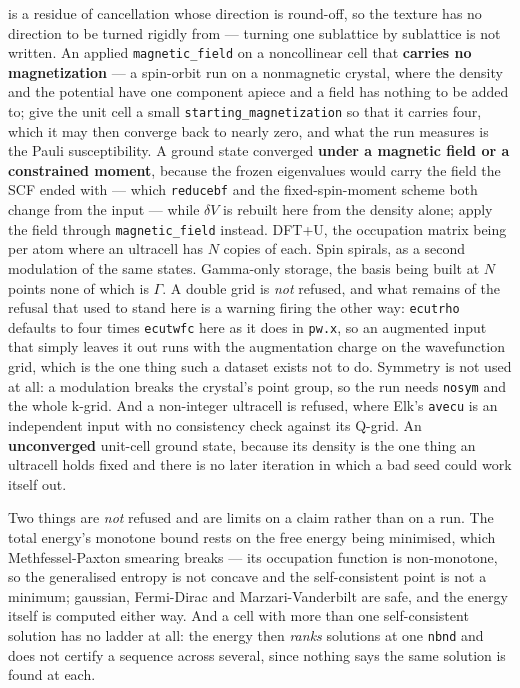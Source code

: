\documentclass[11pt,a4paper]{article}
\newcommand{\code}[1]{\texttt{\small #1}}
\begin{document}
\begin{refuses}
is a residue of cancellation whose direction is round-off, so the texture has no
direction to be turned rigidly from --- turning one sublattice by sublattice is
not written. An applied \code{magnetic\_field} on a noncollinear cell that
\textbf{carries no magnetization} --- a spin-orbit run on a nonmagnetic
crystal, where the density and the potential have one component apiece and a
field has nothing to be added to; give the unit cell a small
\code{starting\_magnetization} so that it carries four, which it may then
converge back to nearly zero, and what the run measures is the Pauli
susceptibility. A ground state converged \textbf{under
a magnetic field or a constrained moment}, because the frozen eigenvalues would
carry the field the SCF ended with --- which \code{reducebf} and the
fixed-spin-moment scheme both change from the input --- while $\delta V$ is
rebuilt here from the density alone; apply the field through
\code{magnetic\_field} instead. DFT+U, the occupation matrix being per atom
where an ultracell has $N$ copies of each. Spin spirals, as a second modulation of the same states.
Gamma-only storage, the basis being built at $N$ points none of which is
$\Gamma$. A double grid is \emph{not} refused, and what remains of the refusal
that used to stand here is a warning firing the other way: \code{ecutrho}
defaults to four times \code{ecutwfc} here as it does in \code{pw.x}, so an
augmented input that simply leaves it out runs with the augmentation charge on
the wavefunction grid, which is the one thing such a dataset exists not to do. Symmetry is not used at all: a modulation breaks the
crystal's point group, so the run needs \code{nosym} and the whole k-grid. And a
non-integer ultracell is refused, where Elk's \code{avecu} is an independent
input with no consistency check against its Q-grid. An \textbf{unconverged}
unit-cell ground state, because its density is the one thing an ultracell holds
fixed and there is no later iteration in which a bad seed could work itself out.

Two things are \emph{not} refused and are limits on a claim rather than on a
run. The total energy's monotone bound rests on the free energy being minimised,
which Methfessel-Paxton smearing breaks --- its occupation function is
non-monotone, so the generalised entropy is not concave and the self-consistent
point is not a minimum; gaussian, Fermi-Dirac and Marzari-Vanderbilt are safe,
and the energy itself is computed either way. And a cell with more than one
self-consistent solution has no ladder at all: the energy then \emph{ranks}
solutions at one \code{nbnd} and does not certify a sequence across several,
since nothing says the same solution is found at each.
\end{refuses}
\end{document}
